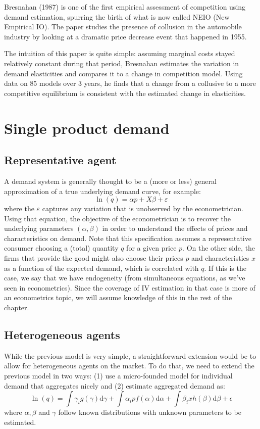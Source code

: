\documentclass[12pt]{report}
\def\D{\mathrm{d}}
\def\D{\mathrm{d}}
\begin{document}
Bresnahan (1987) is one of the first empirical assessment of competition using demand estimation, spurring the birth of what is now called NEIO (New Empirical IO). The paper studies the presence of collusion in the automobile industry by looking at a dramatic price decrease event that happened in 1955.

The intuition of this paper is quite simple: assuming marginal costs stayed relatively constant during that period, Bresnahan estimates the variation in demand elasticities and compares it to a change in competition model. Using data on 85 models over 3 years, he finds that a change from a collusive to a more competitive equilibrium is consistent with the estimated change in elasticities.

\section{Single product demand}

\subsection{Representative agent}

A demand system is generally thought to be a (more or less) general approximation of a true underlying demand curve, for example: $$\ln(q) = \alpha p + X\beta + \varepsilon $$ where the $\varepsilon$ captures any variation that is unobserved by the econometrician. Using that equation, the objective of the econometrician is to recover the underlying parameters $(\alpha, \beta)$ in order to understand the effects of prices and characteristics on demand. Note that this specification assumes a representative consumer choosing a (total) quantity $q$ for a given price $p$. On the other side, the firms that provide the good might also choose their prices $p$ and characteristics $x$ as a function of the expected demand, which is correlated with $q$. If this is the case, we say that we have endogeneity (from simultaneous equations, as we've seen in econometrics). Since the coverage of IV estimation in that case is more of an econometrics topic, we will assume knowledge of this in the rest of the chapter.

\subsection{Heterogeneous agents}

While the previous model is very simple, a straightforward extension would be to allow for heterogeneous agents on the market. To do that, we need to extend the previous model in two ways: (1) use a micro-founded model for individual demand that aggregates nicely and (2) estimate aggregated demand as: $$ \ln(q) = \int \gamma_i g(\gamma)\D\gamma + \int \alpha_i p f(\alpha)\D\alpha + \int \beta_i x h(\beta)\D\beta + \epsilon $$ where $\alpha, \beta$ and $\gamma$ follow known distributions with unknown parameters to be estimated.
\end{document}
